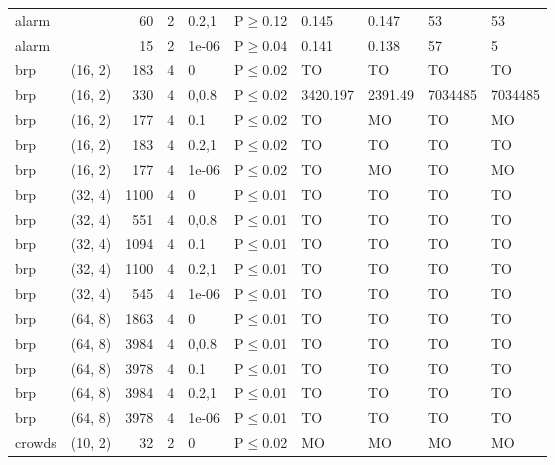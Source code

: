 \begin{longtable}{llrrllllll}
 alarm         &          &     	60 &   2 & 0.2,1 & P$\geq$0.12  & 0.145    & 0.147   & 53      & 53      \\
 alarm         &          &     	15 &   2 & 1e-06 & P$\geq$0.04  & 0.141    & 0.138   & 57      & 5       \\
 brp           & (16, 2)  &    	183 &   4 & 0     & P$\leq$0.02  & TO       & TO      & TO      & TO      \\
 brp           & (16, 2)  &    	330 &   4 & 0,0.8 & P$\leq$0.02  & 3420.197 & 2391.49 & 7034485 & 7034485 \\
 brp           & (16, 2)  &    	177 &   4 & 0.1   & P$\leq$0.02  & TO       & MO      & TO      & MO      \\
 brp           & (16, 2)  &    	183 &   4 & 0.2,1 & P$\leq$0.02  & TO       & TO      & TO      & TO      \\
 brp           & (16, 2)  &    	177 &   4 & 1e-06 & P$\leq$0.02  & TO       & MO      & TO      & MO      \\
 brp           & (32, 4)  &   	1100 &   4 & 0     & P$\leq$0.01  & TO       & TO      & TO      & TO      \\
 brp           & (32, 4)  &    	551 &   4 & 0,0.8 & P$\leq$0.01  & TO       & TO      & TO      & TO      \\
 brp           & (32, 4)  &   	1094 &   4 & 0.1   & P$\leq$0.01  & TO       & TO      & TO      & TO      \\
 brp           & (32, 4)  &   	1100 &   4 & 0.2,1 & P$\leq$0.01  & TO       & TO      & TO      & TO      \\
 brp           & (32, 4)  &    	545 &   4 & 1e-06 & P$\leq$0.01  & TO       & TO      & TO      & TO      \\
 brp           & (64, 8)  &   	1863 &   4 & 0     & P$\leq$0.01  & TO       & TO      & TO      & TO      \\
 brp           & (64, 8)  &   	3984 &   4 & 0,0.8 & P$\leq$0.01  & TO       & TO      & TO      & TO      \\
 brp           & (64, 8)  &   	3978 &   4 & 0.1   & P$\leq$0.01  & TO       & TO      & TO      & TO      \\
 brp           & (64, 8)  &   	3984 &   4 & 0.2,1 & P$\leq$0.01  & TO       & TO      & TO      & TO      \\
 brp           & (64, 8)  &   	3978 &   4 & 1e-06 & P$\leq$0.01  & TO       & TO      & TO      & TO      \\
 crowds        & (10, 2)  &     	32 &   2 & 0     & P$\leq$0.02  & MO       & MO      & MO      & MO      \\

\end{longtable}
